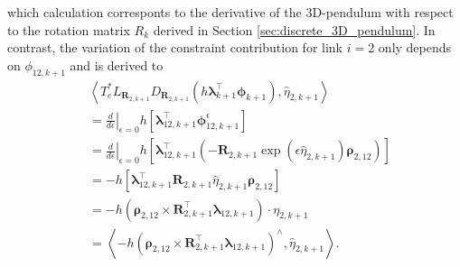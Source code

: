 which calculation corresponts to the derivative of the 3D-pendulum with respect to the rotation matrix $R_k$ derived in Section \ref{sec:discrete_3D_pendulum}. 
In contrast, the variation of the constraint contribution for link $i=2$ only depends on $\phi_{12,k+1}$ and is derived to
\begin{equation}
    \begin{aligned}
    &
    \left\langle
    T_e^*L_{\bm{R}_{2,k+1}}
    D_{\bm{R}_{2,k+1}}
    \left(
    h\bm{\lambda}_{k+1}^{\top}\bm{\phi}_{k+1}
    \right),
    \hat{\eta}_{2,k+1}
    \right\rangle
    \\
    &=
    \left.
    \frac{d}{d\epsilon}
    \right|_{\epsilon=0}
    h
    \left[
    \bm{\lambda}_{12,k+1}^{\top}
    \bm{\phi}_{12,k+1}^{\epsilon}
    \right]
    \\
    &=
    \left.
    \frac{d}{d\epsilon}
    \right|_{\epsilon=0}
    h
    \left[
    \bm{\lambda}_{12,k+1}^{\top}
    \left(
    -
    \bm{R}_{2,k+1}
    \exp(\epsilon\hat{\eta}_{2,k+1})
    \bm{\rho}_{2,12}
    \right)
    \right]
    \\
    &=
    -h
    \left[
    \bm{\lambda}_{12,k+1}^{\top}
    \bm{R}_{2,k+1}
    \hat{\eta}_{2,k+1}
    \bm{\rho}_{2,12}
    \right]
    \\
    &=
    -h
    \left(
    \bm{\rho}_{2,12}
    \times
    \bm{R}_{2,k+1}^{\top}\bm{\lambda}_{12,k+1}
    \right)
    \cdot
    \eta_{2,k+1}
    \\
    &=
    \left\langle
    -h
    \left(
    \bm{\rho}_{2,12}
    \times
    \bm{R}_{2,k+1}^{\top}\bm{\lambda}_{12,k+1}
    \right)^{\wedge},
    \hat{\eta}_{2,k+1}
    \right\rangle .
    \end{aligned}
    \label{eq:acrobot_R2_constraint_derivative_kp1}
\end{equation}

